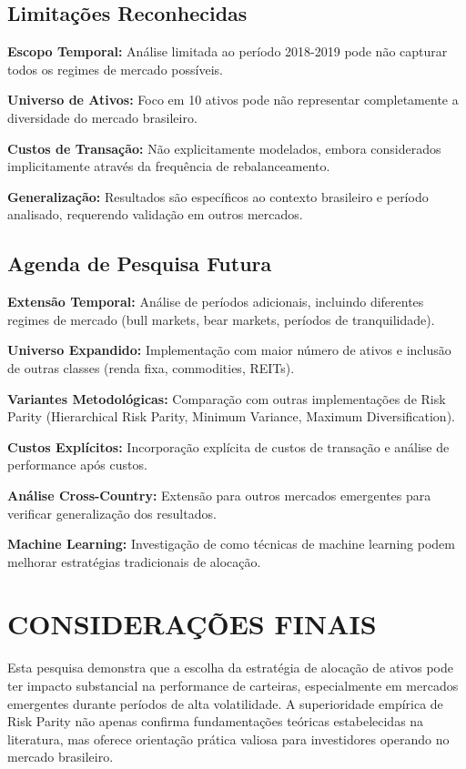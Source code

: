 \subsection{Limitações Reconhecidas}

\textbf{Escopo Temporal:} Análise limitada ao período 2018-2019 pode não capturar todos os regimes de mercado possíveis.

\textbf{Universo de Ativos:} Foco em 10 ativos pode não representar completamente a diversidade do mercado brasileiro.

\textbf{Custos de Transação:} Não explicitamente modelados, embora considerados implicitamente através da frequência de rebalanceamento.

\textbf{Generalização:} Resultados são específicos ao contexto brasileiro e período analisado, requerendo validação em outros mercados.

\subsection{Agenda de Pesquisa Futura}

\textbf{Extensão Temporal:} Análise de períodos adicionais, incluindo diferentes regimes de mercado (bull markets, bear markets, períodos de tranquilidade).

\textbf{Universo Expandido:} Implementação com maior número de ativos e inclusão de outras classes (renda fixa, commodities, REITs).

\textbf{Variantes Metodológicas:} Comparação com outras implementações de Risk Parity (Hierarchical Risk Parity, Minimum Variance, Maximum Diversification).

\textbf{Custos Explícitos:} Incorporação explícita de custos de transação e análise de performance após custos.

\textbf{Análise Cross-Country:} Extensão para outros mercados emergentes para verificar generalização dos resultados.

\textbf{Machine Learning:} Investigação de como técnicas de machine learning podem melhorar estratégias tradicionais de alocação.

\section{CONSIDERAÇÕES FINAIS}

Esta pesquisa demonstra que a escolha da estratégia de alocação de ativos pode ter impacto substancial na performance de carteiras, especialmente em mercados emergentes durante períodos de alta volatilidade. A superioridade empírica de Risk Parity não apenas confirma fundamentações teóricas estabelecidas na literatura, mas oferece orientação prática valiosa para investidores operando no mercado brasileiro.

